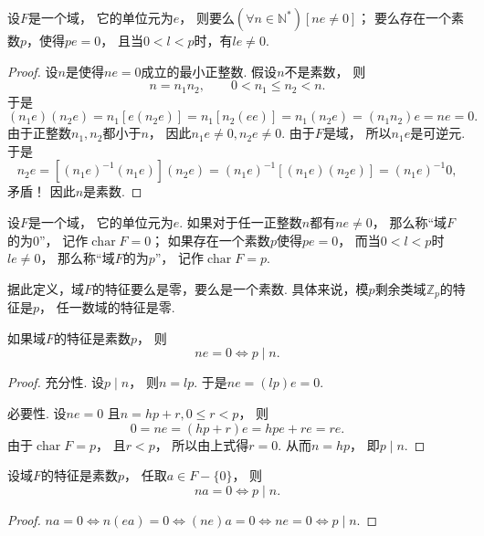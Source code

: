 \begin{theorem}
设\(F\)是一个域，
它的单位元为\(e\)，
则要么\((\forall n\in\mathbb{N}^*)[ne\neq0]\)；
要么存在一个素数\(p\)，使得\(pe=0\)，
且当\(0<l<p\)时，有\(le\neq0\).
\begin{proof}
设\(n\)是使得\(ne=0\)成立的最小正整数.
假设\(n\)不是素数，
则\[
	n=n_1 n_2,
	\qquad
	0<n_1 \leq n_2<n.
\]
于是%
\[
	(n_1 e)(n_2 e)
	=n_1[e(n_2 e)]
	=n_1[n_2(ee)]
	=n_1(n_2 e)
	=(n_1 n_2)e
	=ne=0.
\]
由于正整数\(n_1,n_2\)都小于\(n\)，
因此\(n_1 e\neq0,
n_2 e\neq0\).
由于\(F\)是域，
所以\(n_1 e\)是可逆元.
于是\[
	n_2 e
	=[(n_1 e)^{-1} (n_1 e)](n_2 e)
	=(n_1 e)^{-1}
	[(n_1 e)(n_2 e)]
	=(n_1 e)^{-1} 0,
\]
矛盾！
因此\(n\)是素数.
\end{proof}
\end{theorem}

\def\FieldChar{\operatorname{char}}%
\begin{definition}
设\(F\)是一个域，
它的单位元为\(e\).
如果对于任一正整数\(n\)都有\(ne\neq0\)，
那么称“域\(F\)的为0”，
记作\(\FieldChar F=0\)；
如果存在一个素数\(p\)使得\(pe=0\)，
而当\(0<l<p\)时\(le\neq0\)，
那么称“域\(F\)的为\(p\)”，
记作\(\FieldChar F=p\).
\end{definition}

据此定义，域\(F\)的特征要么是零，要么是一个素数.
具体来说，模\(p\)剩余类域\(\mathbb{Z}_p\)的特征是\(p\)，
任一数域的特征是零.

\begin{corollary}
如果域\(F\)的特征是素数\(p\)，
则\[
	ne=0
	\iff
	p \mid n.
\]
\begin{proof}
充分性.
设\(p \mid n\)，
则\(n=lp\).
于是\(ne
=(lp)e
=0\).

必要性.
设\(ne=0\)
且\(n=hp+r,0\leq r<p\)，
则\[
	0=ne
	=(hp+r)e
	=hpe+re
	=re.
\]
由于\(\FieldChar F=p\)，
且\(r<p\)，
所以由上式得\(r=0\).
从而\(n=hp\)，
即\(p \mid n\).
\end{proof}
\end{corollary}

\begin{corollary}
设域\(F\)的特征是素数\(p\)，
任取\(a \in F-\{0\}\)，
则\[
	na=0
	\iff
	p \mid n.
\]
\begin{proof}
\(na=0
\iff
n(ea)=0
\iff
(ne)a=0
\iff
ne=0
\iff
p \mid n\).
\end{proof}
\end{corollary}
